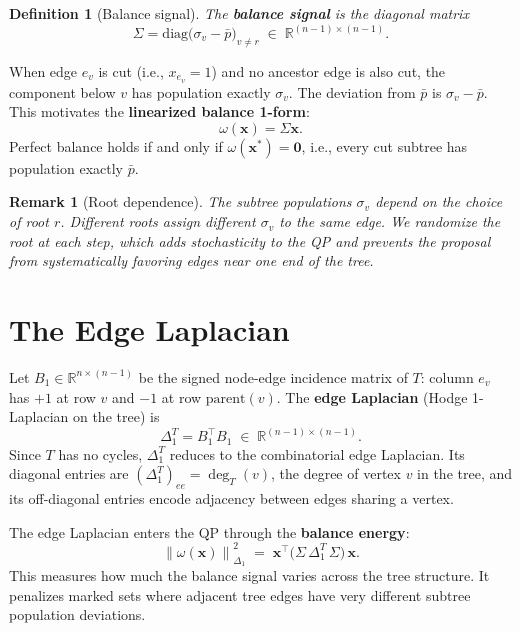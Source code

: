 \documentclass[11pt]{article}
\newtheorem{definition}{Definition}[section]
\newtheorem{remark}{Remark}[section]
\newcommand{\R}{\mathbb{R}}
\newcommand{\norm}[1]{\left\lVert#1\right\rVert}
\newcommand{\pbar}{\bar{p}}
\begin{document}
\begin{definition}[Balance signal]\label{def:balance-signal}
The \textbf{balance signal} is the diagonal matrix
\[
\Sigma = \mathrm{diag}\bigl(\sigma_v - \pbar\bigr)_{v \neq r} \;\in\; \R^{(n-1) \times (n-1)}.
\]
\end{definition}

When edge $e_v$ is cut (i.e., $x_{e_v} = 1$) and no ancestor edge is also cut, the component below $v$ has population exactly $\sigma_v$. The deviation from $\pbar$ is $\sigma_v - \pbar$. This motivates the \textbf{linearized balance 1-form}:
\[
\omega(\mathbf{x}) = \Sigma \mathbf{x}.
\]
Perfect balance holds if and only if $\omega(\mathbf{x}^*) = \mathbf{0}$, i.e., every cut subtree has population exactly $\pbar$.

\begin{remark}[Root dependence]
The subtree populations $\sigma_v$ depend on the choice of root $r$. Different roots assign different $\sigma_v$ to the same edge. We randomize the root at each step, which adds stochasticity to the QP and prevents the proposal from systematically favoring edges near one end of the tree.
\end{remark}


\section{The Edge Laplacian}\label{sec:edge-laplacian}

Let $B_1 \in \R^{n \times (n-1)}$ be the signed node-edge incidence matrix of $T$: column $e_v$ has $+1$ at row $v$ and $-1$ at row $\mathrm{parent}(v)$. The \textbf{edge Laplacian} (Hodge 1-Laplacian on the tree) is
\[
\Delta_1^T = B_1^\top B_1 \;\in\; \R^{(n-1) \times (n-1)}.
\]
Since $T$ has no cycles, $\Delta_1^T$ reduces to the combinatorial edge Laplacian. Its diagonal entries are $(\Delta_1^T)_{ee} = \deg_T(v)$, the degree of vertex $v$ in the tree, and its off-diagonal entries encode adjacency between edges sharing a vertex.

The edge Laplacian enters the QP through the \textbf{balance energy}:
\[
\norm{\omega(\mathbf{x})}^2_{\Delta_1} \;=\; \mathbf{x}^\top \bigl(\Sigma\, \Delta_1^T\, \Sigma\bigr)\, \mathbf{x}.
\]
This measures how much the balance signal varies across the tree structure. It penalizes marked sets where adjacent tree edges have very different subtree population deviations.
\end{document}
